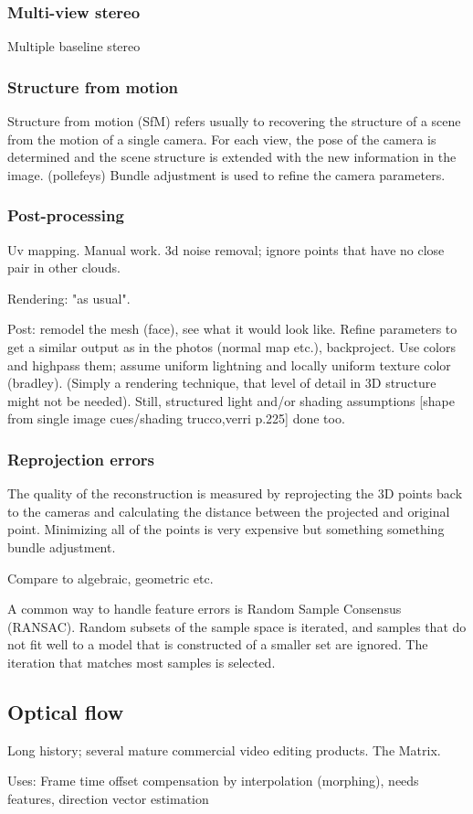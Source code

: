 \subsubsection{Multi-view stereo}

Multiple baseline stereo

\subsubsection{Structure from motion}

Structure from motion (SfM) refers usually to recovering the structure of a scene from the motion of a single camera.
For each view, the pose of the camera is determined and the scene structure is extended with the new information in the image.
(pollefeys)
Bundle adjustment is used to refine the camera parameters.

\subsubsection{Post-processing}

Uv mapping. Manual work. 3d noise removal; ignore points that have no close pair in other clouds.

Rendering: "as usual".

Post: remodel the mesh (face), see what it would look like. Refine parameters to get a similar output as in the photos (normal map etc.), backproject. Use colors and highpass them; assume uniform lightning and locally uniform texture color (bradley). (Simply a rendering technique, that level of detail in 3D structure might not be needed). Still, structured light and/or shading assumptions [shape from single image cues/shading trucco,verri p.225] done too.


\subsubsection{Reprojection errors}

The quality of the reconstruction is measured by reprojecting the 3D points back to the cameras and calculating the distance between the projected and original point.
Minimizing all of the points is very expensive but something something bundle adjustment.

Compare to algebraic, geometric etc.

A common way to handle feature errors is Random Sample Consensus (RANSAC). Random subsets of the sample space is iterated, and samples that do not fit well to a model that is constructed of a smaller set are ignored. The iteration that matches most samples is selected.

\subsection{Optical flow}

Long history; several mature commercial video editing products. The Matrix.

Uses: Frame time offset compensation by interpolation (morphing), needs features, direction vector estimation

